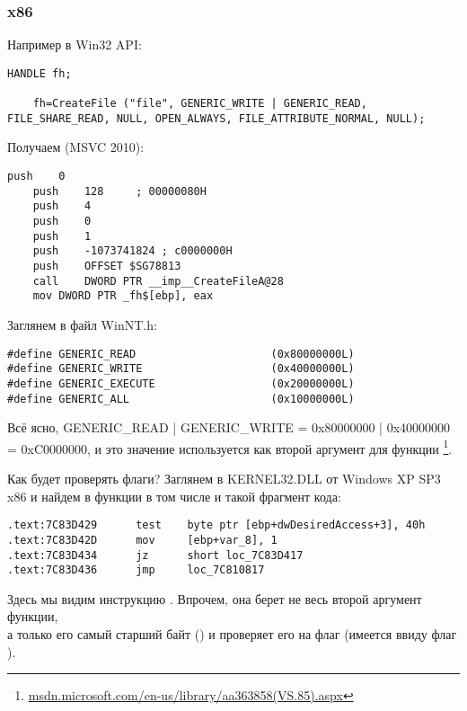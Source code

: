 \subsubsection{x86}

Например в Win32 API:

\begin{lstlisting}[style=customc]
	HANDLE fh;

	fh=CreateFile ("file", GENERIC_WRITE | GENERIC_READ, FILE_SHARE_READ, NULL, OPEN_ALWAYS, FILE_ATTRIBUTE_NORMAL, NULL);
\end{lstlisting}

Получаем (MSVC 2010):

\begin{lstlisting}[caption=MSVC 2010,style=customasmx86]
	push	0
	push	128		; 00000080H
	push	4
	push	0
	push	1
	push	-1073741824	; c0000000H
	push	OFFSET $SG78813
	call	DWORD PTR __imp__CreateFileA@28
	mov	DWORD PTR _fh$[ebp], eax
\end{lstlisting}

Заглянем в файл WinNT.h:

\begin{lstlisting}[caption=WinNT.h,style=customc]
#define GENERIC_READ                     (0x80000000L)
#define GENERIC_WRITE                    (0x40000000L)
#define GENERIC_EXECUTE                  (0x20000000L)
#define GENERIC_ALL                      (0x10000000L)
\end{lstlisting}

Всё ясно,
GENERIC\_READ | GENERIC\_WRITE = 0x80000000 | 0x40000000 = 0xC0000000,
и это значение используется как второй аргумент для функции
\footnote{\href{http://go.yurichev.com/17065}{msdn.microsoft.com/en-us/library/aa363858(VS.85).aspx}}.

Как  будет проверять флаги?
Заглянем в KERNEL32.DLL от Windows XP SP3 x86 и найдем в функции  в том числе и 
такой фрагмент кода:

\begin{lstlisting}[caption=KERNEL32.DLL (Windows XP SP3 x86),style=customasmx86]
.text:7C83D429      test    byte ptr [ebp+dwDesiredAccess+3], 40h
.text:7C83D42D      mov     [ebp+var_8], 1
.text:7C83D434      jz      short loc_7C83D417
.text:7C83D436      jmp     loc_7C810817
\end{lstlisting}

Здесь мы видим инструкцию \TEST. Впрочем, она берет не весь второй аргумент функции,\\
а только его самый старший байт () и проверяет его на флаг 
(имеется ввиду флаг ).

